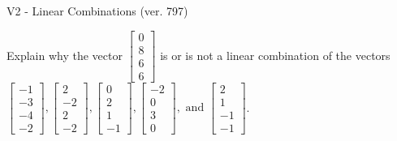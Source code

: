 \begin{exercise}
  \begin{exerciseTitle}V2 - Linear Combinations (ver. 797)\end{exerciseTitle}
  \begin{exerciseStatement}
    Explain why the vector \(\left[\begin{array}{c}
0 \\
8 \\
6 \\
6
\end{array}\right]\)  is or is not a linear 
	combination of the vectors \(\left[\begin{array}{c}
-1 \\
-3 \\
-4 \\
-2
\end{array}\right] , \left[\begin{array}{c}
2 \\
-2 \\
2 \\
-2
\end{array}\right] , \left[\begin{array}{c}
0 \\
2 \\
1 \\
-1
\end{array}\right] , \left[\begin{array}{c}
-2 \\
0 \\
3 \\
0
\end{array}\right] , \text{ and } \left[\begin{array}{c}
2 \\
1 \\
-1 \\
-1
\end{array}\right]\).
	



\end{exerciseStatement}
\end{exercise}
